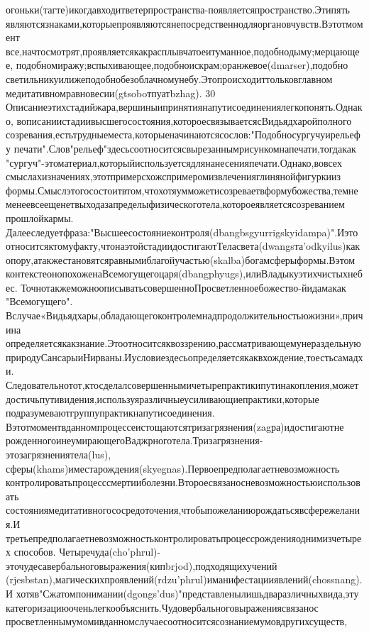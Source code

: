огоньки(тагте)икогдавходитветерпространства-появляетсяпространство.Этипять
являютсязнаками,которыепроявляютсянепосредственнодляоргановчувств.Вэтотмомент
все,начтосмотрят,проявляетсякакрасплывчатоеитуманное,подобнодыму;мерцающее,
подобномиражу;вспыхивающее,подобноискрам;оранжевое(dmarser),подобно
светильникуилижеподобнобезоблачномунебу.Этопроисходиттольковглавном
медитативномравновесии(gtsoboтпуатbzhag).
30
Описаниеэтихстадийжара,вершиныипринятиянапутисоединениялегкопонять.Однако,
вописаниистадиивысшегосостояния,котороесвязываетсясВидьядхаройполного
созревания,естьтрудныеместа,которыеначинаютсясослов:"Подобносургучуирельефу
печати".Слов"рельеф"здесьсоотноситсясвырезаннымрисункомнапечати,тогдакак
"сургуч"-этоматериал,которыйиспользуетсядлянанесенияпечати.Однако,вовсех
смыслахизначениях,этотпримерсхожспримеромизвлеченияглинянойфигуркииз
формы.Смыслэтогосостоитвтом,чтохотяумможетисозреваетвформубожества,темне
менеевсеещенетвыходазапределыфизическоготела,котороеявляетсясозреванием
прошлойкармы.
Далееследуетфраза:"Высшеесостояниеконтроля(dbangbsgyurrigskyidampa)".Иэто
относитсяктомуфакту,чтонаэтойстадиидостигаютТеласвета(dwangsта'odkyilus)как
опору,атакжестановятсяравнымиблагойучастью(skalba)богамсферыформы.Вэтом
контекстеонопохоженаВсемогущегоцаря(dbangphyugs),илиВладыкуэтихчистыхнебес.
ТочнотакжеможноописыватьсовершенноПросветленноебожество-йидамакак
"Всемогущего".
Вслучае«Видьядхары,обладающегоконтролемнадпродолжительностьюжизни»,причина
определяетсякакзнание.Этоотноситсяквоззрению,рассматривающемунераздельную
природуСансарыиНирваны.Иусловиездесьопределяетсякаквхождение,тоестьсамадхи.
Следовательнотот,ктосделалсовершеннымичетырепрактикипутинакопления,может
достичьпутивидения,используяразличныеусиливающиепрактики,которые
подразумеваютгруппупрактикнапутисоединения.
Вэтотмоментвданномпроцессеистощаютсятризагрязнения(zagра)идостигаютне
рожденногоинеумирающегоВаджрноготела.Тризагрязнения-этозагрязнениятела(lus),
сферы(khams)иместарождения(skyegnas).Первоепредполагаетневозможность
контролироватьпроцесссмертииболезни.Второесвязаносневозможностьюиспользовать
состояниямедитативногососредоточения,чтобыпожеланиюрождатьсявсфережелания.И
третьепредполагаетневозможностьконтролироватьпроцессрожденияоднимизчетырех
способов.
Четыречуда(cho'phrul)-эточудесавербальноговыражения(кипbrjod),подходящихучений
(rjesbstan),магическихпроявлений(rdzu'phrul)иманифестацииявлений(chossnang).И
хотяв"Сжатомпонимании(dgongs'dus)"представленылишьдваразличныхвида,эту
категоризациюоченьлегкообъяснить.Чудовербальноговыражениясвязанос
просветленнымумомивданномслучаесоотноситсясознаниемумовдругихсуществ,
